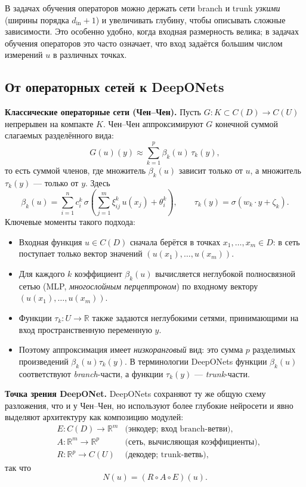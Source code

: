 \documentclass[../NDCNNAI_main.tex]{subfiles}
\begin{document}
\begin{remark}
В задачах обучения операторов можно держать сети branch и trunk \emph{узкими}
(ширины порядка $d_{\mathrm{in}}+1$) и увеличивать глубину, чтобы описывать сложные зависимости.
Это особенно удобно, когда входная размерность велика; в задачах обучения операторов это часто означает,
что вход задаётся большим числом измерений  $u$ в различных точках.
\end{remark}

\subsection{От операторных сетей к DeepONets}

\textbf{Классические операторные сети (Чен--Чен).}
Пусть $G\colon K \subset C(D)\to C(U)$ непрерывен на компакте $K$.
Чен--Чен аппроксимируют $G$ конечной суммой слагаемых разделённого вида:
$$
G(u)(y)\approx \sum_{k=1}^{p}\beta_k(u)\,\tau_k(y),
$$
то есть суммой членов, где множитель $\beta_k(u)$ зависит только от $u$, а множитель $\tau_k(y)$ --- только от $y$.
Здесь
$$
\beta_k(u)=\sum_{i=1}^{n} c_i^{k}\,\sigma\!\left(\sum_{j=1}^{m}\xi_{ij}^{k}\,u(x_j)+\theta_i^{k}\right),
\qquad
\tau_k(y)=\sigma\!\left(w_k\cdot y+\zeta_k\right).
$$
Ключевые моменты такого подхода:
\begin{itemize}
  \item Входная функция $u\in C(D)$ сначала берётся в точках $x_1,\ldots,x_m\in D$: в сеть поступает только вектор значений
  $(u(x_1),\ldots,u(x_m))$.
  \item Для каждого $k$ коэффициент $\beta_k(u)$ вычисляется неглубокой полносвязной сетью
  (MLP, \emph{многослойным перцептроном}) по входному вектору $(u(x_1),\ldots,u(x_m))$.
  \item Функции $\tau_k\colon U\to\mathbb{R}$ также задаются неглубокими сетями,
  принимающими на вход пространственную переменную $y$.
  \item Поэтому аппроксимация имеет \emph{низкоранговый} вид: это сумма $p$ разделимых произведений
  $\beta_k(u)\tau_k(y)$.
  В терминологии DeepONets функции $\beta_k(u)$ соответствуют \emph{branch}-части,
  а функции $\tau_k(y)$ --- \emph{trunk}-части.
\end{itemize}


\textbf{Точка зрения DeepONet.}
DeepONets сохраняют ту же общую схему разложения, что и у Чен--Чен,
но используют более глубокие нейросети и явно выделяют архитектуру как композицию модулей:
\begin{align*}
  & E\colon C(D)\to \mathbb{R}^m &  \text{(энкодер; вход branch-ветви)},\\
  & A\colon \mathbb{R}^m \to \mathbb{R}^p & \text{(сеть, вычисляющая коэффициенты)},\\
  & R\colon \mathbb{R}^p \to C(U) & \text{(декодер; trunk-ветвь)},
\end{align*}
так что
$$
N(u) = (R\circ A\circ E)(u).
$$
\end{document}
